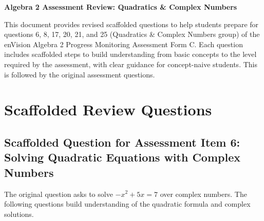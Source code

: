 \documentclass[12pt]{article}
\begin{document}
\begin{center}
    \textbf{Algebra 2 Assessment Review: Quadratics \& Complex Numbers}
\end{center}

This document provides revised scaffolded questions to help students prepare for questions 6, 8, 17, 20, 21, and 25 (Quadratics \& Complex Numbers group) of the enVision Algebra 2 Progress Monitoring Assessment Form C. Each question includes scaffolded steps to build understanding from basic concepts to the level required by the assessment, with clear guidance for concept-naive students. This is followed by the original assessment questions.

\section*{Scaffolded Review Questions}

\subsection*{Scaffolded Question for Assessment Item 6: Solving Quadratic Equations with Complex Numbers}
The original question asks to solve \( -x^2 + 5x = 7 \) over complex numbers. The following questions build understanding of the quadratic formula and complex solutions.
\end{document}
